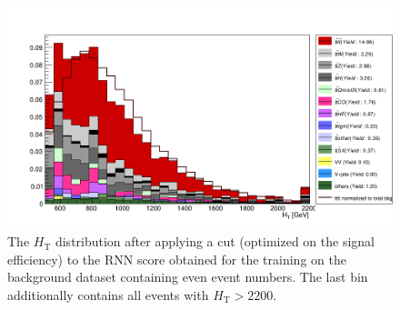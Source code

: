 \begin{figure}[H]
\centering
\includegraphics[width=\linewidth]{figs/RNN/HT_all_Even}
\caption{The $H_{\text{T}}$ distribution after applying a cut (optimized on the signal efficiency) to the RNN score obtained for the training on the background dataset containing even event numbers. The last bin additionally contains all events with $H_{\text{T}} > 2200$.}
\label{fig:RNNHT}
\end{figure}


